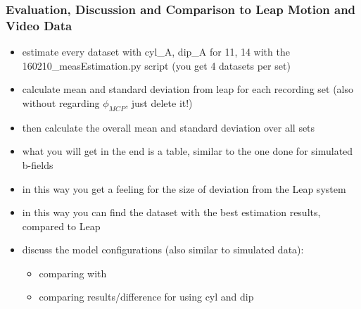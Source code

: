 \subsubsection{Evaluation, Discussion and Comparison to Leap Motion and Video Data}
	\begin{itemize}
	\item estimate every dataset with cyl\_A, dip\_A for 11, 14 with the 160210\_measEstimation.py script (you get 4 datasets per set)
	\item calculate mean and standard deviation from leap for each recording set (also without regarding $ \phi_{MCP} $, just delete it!)
	\item then calculate the overall mean and standard deviation over all sets 
	\item what you will get in the end is a table, similar to the one done for simulated b-fields
	\item in this way you get a feeling for the size of deviation from the Leap system
	\item in this way you can find the dataset with the best estimation results, compared to Leap
	
	\item discuss the model configurations (also similar to simulated data):	
		\begin{itemize}
		\item comparing \grqq with \grqq
			
		\item comparing results/difference for using cyl and dip
		

\end{itemize}
\end{itemize}
